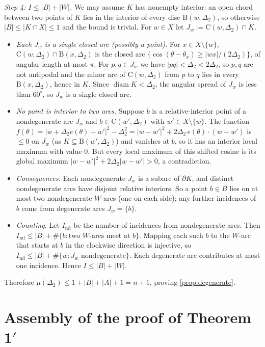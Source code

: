 \documentclass[11pt]{amsart}
\theoremstyle{definition}
\theoremstyle{remark}
\newcommand{\Dt}{\Delta_2}
\newcommand{\mult}{\mu}
\newcommand{\Cc}{\mathrm{C}}      %
\newcommand{\Dd}{\mathrm{B}}      %
\begin{document}
\emph{Step 4: $I\le|B|+|W|$.} We may assume $K$ has nonempty interior: an open chord between two points of $K$ lies in the interior of every disc $\Dd(w,\Dt)$, so otherwise $|B|\le|K\cap X|\le1$ and the bound is trivial. For $w\in X$ let $J_w:=\Cc(w,\Dt)\cap K$.
\begin{itemize}[leftmargin=2em]
\item \emph{Each $J_w$ is a single closed arc (possibly a point).} For $x\in X\setminus\{w\}$, $\Cc(w,\Dt)\cap\Dd(x,\Dt)$ is the closed arc $\{\cos(\theta-\theta_x)\ge|wx|/(2\Dt)\}$, of angular length at most $\pi$. For $p,q\in J_w$ we have $|pq|<\Dt<2\Dt$, so $p,q$ are not antipodal and the minor arc of $\Cc(w,\Dt)$ from $p$ to $q$ lies in every $\Dd(x,\Dt)$, hence in $K$. Since $\operatorname{diam}K<\Dt$, the angular spread of $J_w$ is less than $60^\circ$, so $J_w$ is a single closed arc.
\item \emph{No point is interior to two arcs.} Suppose $b$ is a relative-interior point of a nondegenerate arc $J_w$ and $b\in\Cc(w',\Dt)$ with $w'\in X\setminus\{w\}$. The function $f(\theta)=|w+\Dt e(\theta)-w'|^2-\Dt^2=|w-w'|^2+2\Dt\,e(\theta)\cdot(w-w')$ is $\le0$ on $J_w$ (as $K\subseteq\Dd(w',\Dt)$) and vanishes at $b$, so it has an interior local maximum with value $0$. But every local maximum of this shifted cosine is its global maximum $|w-w'|^2+2\Dt|w-w'|>0$, a contradiction.
\item \emph{Consequences.} Each nondegenerate $J_w$ is a subarc of $\partial K$, and distinct nondegenerate arcs have disjoint relative interiors. So a point $b\in B$ lies on at most two nondegenerate $W$-arcs (one on each side); any further incidences of $b$ come from degenerate arcs $J_w=\{b\}$.
\item \emph{Counting.} Let $I_{\mathrm{nd}}$ be the number of incidences from nondegenerate arcs. Then $I_{\mathrm{nd}}\le|B|+\#\{b:\text{two $W$-arcs meet at }b\}$. Mapping each such $b$ to the $W$-arc that starts at $b$ in the clockwise direction is injective, so $I_{\mathrm{nd}}\le|B|+\#\{w:J_w\text{ nondegenerate}\}$. Each degenerate arc contributes at most one incidence. Hence $I\le|B|+|W|$.
\end{itemize}
Therefore $\mult(\Dt)\le1+|B|+|A|+1=n+1$, proving \cref{prop:degenerate}.

\section{Assembly of the proof of Theorem 1\texorpdfstring{$'$}{'}}\label{sec:assembly}
\end{document}
